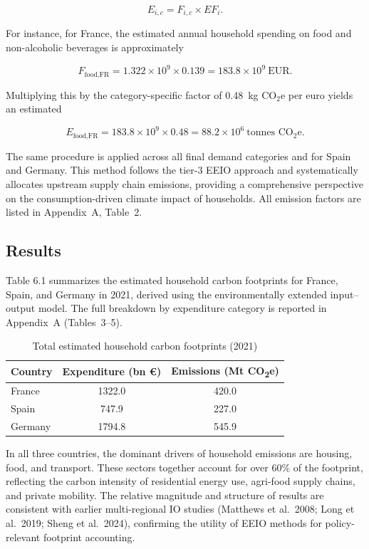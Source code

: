 \documentclass[12pt,a4paper]{article}%
\begin{document}
\[
E_{i,c} = F_{i,c} \times EF_i.
\]

For instance, for France, the estimated annual household spending on food and non-alcoholic beverages is approximately

\[
F_{\text{food,FR}} = 1.322 \times 10^9 \times 0.139 = 183.8 \times 10^9~\text{EUR}.
\]

Multiplying this by the category-specific factor of 0.48~kg CO$_2$e per euro yields an estimated

\[
E_{\text{food,FR}} = 183.8 \times 10^9 \times 0.48 = 88.2 \times 10^6~\text{tonnes CO}_2\text{e}.
\]

The same procedure is applied across all final demand categories and for Spain and Germany. This method follows the tier-3 EEIO approach and systematically allocates upstream supply chain emissions, providing a comprehensive perspective on the consumption-driven climate impact of households. All emission factors are listed in Appendix~A, Table~2.

\subsection{Results}

Table 6.1 summarizes the estimated household carbon footprints for France, Spain, and Germany in 2021, derived using the environmentally extended input--output model. The full breakdown by expenditure category is reported in Appendix~A (Tables~3--5).

\begin{table}[h]
\centering
\caption{Total estimated household carbon footprints (2021)}
\begin{tabular}{lcc}
\toprule
\textbf{Country} & \textbf{Expenditure (bn €)} & \textbf{Emissions (Mt CO\textsubscript{2}e)} \\
\midrule
France & 1322.0 & 420.0 \\
Spain & 747.9 & 227.0 \\
Germany & 1794.8 & 545.9 \\
\bottomrule
\end{tabular}
\end{table}

In all three countries, the dominant drivers of household emissions are housing, food, and transport. These sectors together account for over 60\% of the footprint, reflecting the carbon intensity of residential energy use, agri-food supply chains, and private mobility. The relative magnitude and structure of results are consistent with earlier multi-regional IO studies (Matthews et al.~2008; Long et al.~2019; Sheng et al.~2024), confirming the utility of EEIO methods for policy-relevant footprint accounting.
\end{document}
